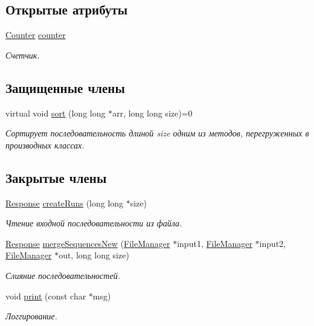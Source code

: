 \subsection*{Открытые атрибуты}
\begin{DoxyCompactItemize}
\item 
\hyperlink{class_counter}{Counter} \hyperlink{class_external_merge_sort_ac9cb039a5cda56e66aecbc17465dd237}{counter}
\begin{DoxyCompactList}\small\item\em Счетчик. \end{DoxyCompactList}\end{DoxyCompactItemize}
\subsection*{Защищенные члены}
\begin{DoxyCompactItemize}
\item 
virtual void \hyperlink{class_external_merge_sort_a7b777f22151fdd869624d8aa5a39a7bb}{sort} (long long $\ast$arr, long long size)=0
\begin{DoxyCompactList}\small\item\em Сортирует последовательность длиной size одним из методов, перегруженных в производных классах. \end{DoxyCompactList}\end{DoxyCompactItemize}
\subsection*{Закрытые члены}
\begin{DoxyCompactItemize}
\item 
\hyperlink{_structures_8h_ab3500e5d3c915d1b5cc58dcab8673fd4}{Response} \hyperlink{class_external_merge_sort_aae72743234c39c35a3460fecefa3a1f0}{create\+Runs} (long long $\ast$size)
\begin{DoxyCompactList}\small\item\em Чтение входной последовательности из файла. \end{DoxyCompactList}\item 
\hyperlink{_structures_8h_ab3500e5d3c915d1b5cc58dcab8673fd4}{Response} \hyperlink{class_external_merge_sort_ad19b6bded122acbb6a4ee97b591011f8}{merge\+Sequences\+New} (\hyperlink{class_file_manager}{File\+Manager} $\ast$input1, \hyperlink{class_file_manager}{File\+Manager} $\ast$input2, \hyperlink{class_file_manager}{File\+Manager} $\ast$out, long long size)
\begin{DoxyCompactList}\small\item\em Слияние последовательностей. \end{DoxyCompactList}\item 
void \hyperlink{class_external_merge_sort_a7a6b94fff35130ed6a498f9a31d0f863}{print} (const char $\ast$msg)
\begin{DoxyCompactList}\small\item\em Логгирование. \end{DoxyCompactList}\end{DoxyCompactItemize}
